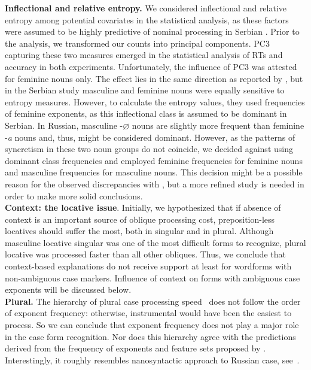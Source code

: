 \documentclass[output=paper, modfonts,newtxmath,hidelinks]{langscibook}
\begin{document}
\textbf{Inflectional and relative entropy.} We considered inflectional and relative entropy among potential covariates in the statistical analysis, as these factors were assumed to be highly predictive of nominal processing in Serbian \citep{milin2009simultaneous}. Prior to the analysis, we transformed our counts into principal components. PC3 capturing these two measures emerged in the statistical analysis of RTs and accuracy in both experiments. Unfortunately, the influence of PC3 was attested for feminine nouns only. The effect lies in the same direction as reported by \citet*{milin2009simultaneous}, but in the Serbian study masculine and feminine nouns were equally sensitive to entropy measures. However, to calculate the entropy values, they used frequencies of feminine exponents, as this inflectional class is assumed to be dominant in Serbian. In Russian, masculine -$\varnothing$ nouns are slightly more frequent than feminine -\textit{a} nouns \citep{samojlova2014frequencies} and, thus, might be considered dominant. However, as the patterns of syncretism in these two noun groups do not coincide, we decided against using dominant class frequencies and employed feminine frequencies for feminine nouns and masculine frequencies for masculine nouns. This decision might be a possible reason for the observed discrepancies with \citet{milin2009simultaneous}, but a more refined study is needed in order to make more solid conclusions.\\

\textbf{Context: the locative issue}. Initially, we hypothesized that if absence of context is an important source of oblique processing cost, preposition-less locatives should suffer the most, both in singular and in plural. Although masculine locative singular was one of the most difficult forms to recognize, plural locative was processed faster than all other obliques. Thus, we conclude that context-based explanations do not receive support at least for wordforms with non-ambiguous case markers. Influence of context on forms with ambiguous case exponents will be discussed below.\\

\textbf{Plural.} The hierarchy of plural case processing speed~ does not follow the order of exponent frequency: otherwise, instrumental would have been the easiest to process. So we can conclude that exponent frequency does not play a major role in the case form recognition. Nor does this hierarchy agree with the predictions derived from the frequency of exponents and feature sets proposed by \citet{muller2004decomposing, wiese2004categories, wunderlich2004there}. Interestingly, it roughly resembles  nanosyntactic approach to Russian case, see~.
\end{document}
